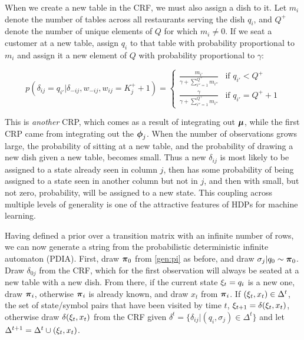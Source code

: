 {When we create a new table in the CRF, we must also assign a dish to it.    Let $m_i$ denote the number of tables across all restaurants serving the dish $q_i$, and $Q^+$ denote the number of unique elements of $Q$ for which $m_i \ne 0$.  If we seat a customer at a new table, assign $q_i$ to that table with probability proportional to $m_i$ and assign it a new element of $Q$ with probability proportional to $\gamma$:

\begin{equation}
p(\delta_{ij} = q_{i'} | \delta_{-ij}, w_{-ij}, w_{ij} = K^+_j + 1) = 
\begin{cases}
\frac{m_{i'}}{\gamma + \sum_{i'' = 1}^{Q^+} m_{i''} } & \text{if } q_{i'} < Q^+ \\
\frac{\gamma}{\gamma + \sum_{i'' = 1}^{Q^+} m_{i''} } & \text{if } q_{i'} = Q^+ + 1\label{crf:high}
\end{cases}
\end{equation}

This is {\em another} CRP, which comes as a result of integrating out $\bmu$, while the first CRP came from integrating out the $\bphi_j$.  When the number of observations grows large, the probability of sitting at a new table, and the probability of drawing a new dish given a new table, becomes small.  Thus a new $\delta_{ij}$ is most likely to be assigned to a state already seen in column $j$, then has some probability of being assigned to a state seen in another column but not in $j$, and then with small, but not zero, probability, will be assigned to a new state.  This coupling across multiple levels of generality is one of the attractive features of HDPs for machine learning.


Having defined a prior over a transition matrix with an infinite number of rows, we can now generate a string from the probabilistic deterministic infinite automaton (PDIA).  First, draw $\bpi_0$ from \eqref{gen:pi} as before, and draw $\sigma_j|q_0 \sim \bpi_0$.  Draw $\delta_{0j}$ from the CRF, which for the first observation will always be seated at a new table with a new dish.  From there, if the current state $\q_t = q_i$ is a new one, draw $\bpi_i$, otherwise $\bpi_i$ is already known, and draw $x_t$ from $\bpi_i$.  If $(\q_t,x_t) \in \Delta^t$, the set of state/symbol pairs that have been visited by time $t$, $\q_{t+1} = \delta(\q_t,x_t)$, otherwise draw $\delta(\q_t,x_t)$ from the CRF given $\delta^t = \{\delta_{ij}|(q_i,\sigma_j)\in\Delta^t\}$ and let $\Delta^{t+1} = \Delta^t \cup (\q_t,x_t)$.



}
